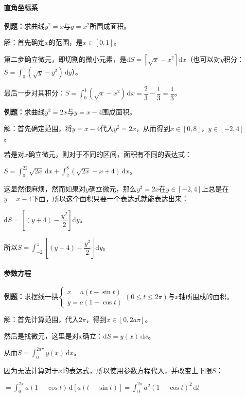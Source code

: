 \documentclass[UTF8, 12pt]{ctexart}
\begin{document}
\paragraph{直角坐标系} \leavevmode \medskip

\textbf{例题：}求曲线$y^2=x$与$y=x^2$所围成面积。

解：首先确定$x$的范围，是$x\in[0,1]$。

第二步确立微元，即切割的微小元素，是$\textrm{d}S=[\sqrt{x}-x^2]\textrm{d}x$（也可以对$y$积分：$S=\int_0^1(\sqrt{y}-y^2)\,\textrm{d}y$）。

最后一步对其积分：$S=\int_0^1(\sqrt{x}-x^2)\,\textrm{d}x=\dfrac{2}{3}-\dfrac{1}{3}=\dfrac{1}{3}$。

\textbf{例题：}求曲线$y^2=2x$与$y=x-4$围成面积。

解：首先确定范围，将$y=x-4$代入$y^2=2x$，从而得到$x\in[0,8]$，$y\in[-2,4]$。

若是对$x$确立微元，则对于不同的区间，面积有不同的表达式：

$S=\int_0^22\sqrt{2x}\,\textrm{d}x+\int_2^8(\sqrt{2x}-x+4)\,\textrm{d}x$。

这显然很麻烦，然而如果对$y$确立微元，那么$y^2=2x$在$y\in[-2,4]$上总是在$y=x-4$下面，所以这个面积只要一个表达式就能表达出来：

$\textrm{d}S=\left[(y+4)-\dfrac{y^2}{2}\right]\textrm{d}y$。

所以$S=\displaystyle{\int_{-2}^4\left[(y+4)-\dfrac{y^2}{2}\right]\textrm{d}y}$。

\paragraph{参数方程} \leavevmode \medskip

\textbf{例题：}求摆线一拱$\left\{\begin{array}{l}
    x=a(t-\sin t) \\
    y=a(1-\cos t)
\end{array}
\right.$$(0\leqslant t\leqslant 2\pi)$与$x$轴所围成的面积。\medskip

解：首先计算范围，代入$2\pi$，得到$x\in[0,2a\pi]$。

然后是找微元，这里是对$x$确立：$\textrm{d}S=y(x)\,\textrm{d}x$。

从而$S=\int_0^{2a\pi}y(x)\,\textrm{d}x$。

因为无法计算对于$x$的表达式，所以使用参数方程代入，并改变上下限$S$：

$=\int_0^{2\pi}a(1-\cos t)\,\textrm{d}[a(t-\sin t)]=\int_0^{2\pi}a^2(1-\cos t)^2\,\textrm{d}t$
\end{document}
